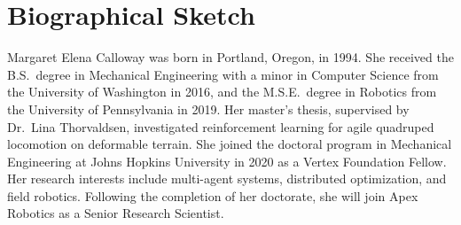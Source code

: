 \documentclass[12pt,oneside]{report}
\theoremstyle{definition}
\theoremstyle{remark}
\begin{document}
\chapter*{Biographical Sketch}
{}

Margaret Elena Calloway was born in Portland, Oregon, in 1994. She received
the B.S.\ degree in Mechanical Engineering with a minor in Computer Science
from the University of Washington in 2016, and the M.S.E.\ degree in Robotics
from the University of Pennsylvania in 2019. Her master's thesis, supervised
by Dr.\ Lina Thorvaldsen, investigated reinforcement learning for agile
quadruped locomotion on deformable terrain. She joined the doctoral program
in Mechanical Engineering at Johns Hopkins University in 2020 as a Vertex
Foundation Fellow. Her research interests include multi-agent systems,
distributed optimization, and field robotics. Following the completion of
her doctorate, she will join Apex Robotics as a Senior Research Scientist.
\end{document}
